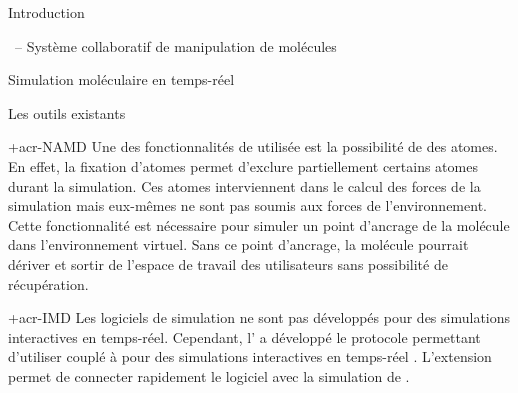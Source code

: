 \documentclass[myfrancais]{mythesis}
\begin{document}
\begin{mypart}{Introduction}
\begin{mychapter}{\myShaddock\ -- Système collaboratif de manipulation de molécules}
\begin{mysection}{Simulation moléculaire en temps-réel}
\begin{mysubsection}{Les outils existants}
\begin{mysubsubsection}{\myacronl+{acr-NAMD}}
						Une des fonctionnalités de  utilisée est la possibilité de  des atomes.
						En effet, la fixation d'atomes permet d'exclure partiellement certains atomes durant la simulation.
						Ces atomes interviennent dans le calcul des forces de la simulation mais eux-mêmes ne sont pas soumis aux forces de l'environnement.
						Cette fonctionnalité est nécessaire pour simuler un point d'ancrage de la molécule dans l'environnement virtuel.
						Sans ce point d'ancrage, la molécule pourrait dériver et sortir de l'espace de travail des utilisateurs sans possibilité de récupération.
					\end{mysubsubsection}
					\begin{mysubsubsection}{\myacronl+{acr-IMD}}
						Les logiciels de simulation ne sont pas développés pour des simulations interactives en temps-réel.
						Cependant, l' a développé le protocole  permettant d'utiliser  couplé à  pour des simulations interactives en temps-réel .
						L'extension  permet de connecter rapidement le logiciel  avec la simulation de .


\end{mysubsubsection}
\end{mysubsection}
\end{mysection}
\end{mychapter}
\end{mypart}
\end{document}
